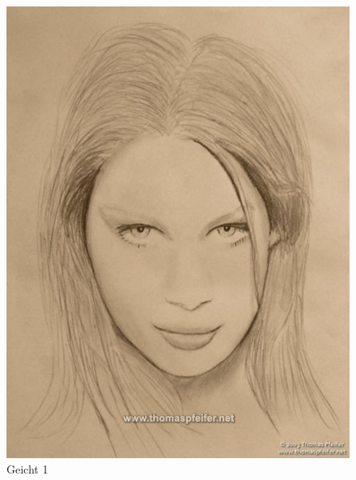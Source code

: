 \begin{figure}[h]
	\begin{minipage}[h]{5cm}
		\centering
			\includegraphics[width=1\textwidth]{bilder.jpg}
		\caption{Geicht 1}
		\label{gig:Gesicht1}
	\end{minipage}
	\hfill
	\begin{minipage}[h]{5cm}
		\centering

\end{minipage}
\end{figure}
